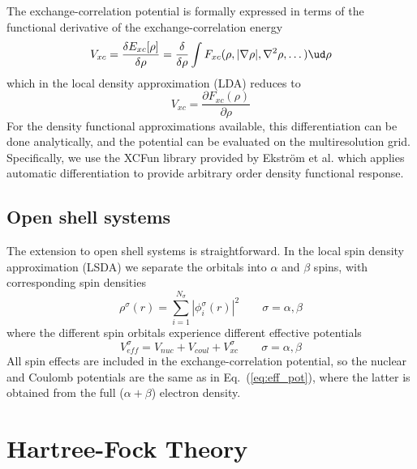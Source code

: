 The exchange-correlation potential is formally expressed in terms of the 
functional derivative of the exchange-correlation energy
\begin{equation}
    V_{xc} 	= \frac{\delta E_{xc}[\rho]}{\delta \rho} 
		= \frac{\delta}{\delta \rho} \int F_{xc}(\rho,|\nabla\rho|,\nabla^2\rho,\dots) \ud \rho
\end{equation}
which in the local density approximation (LDA) reduces to
\begin{equation}
    V_{xc} = \frac{\partial F_{xc}(\rho)}{\partial \rho}
\end{equation}
For the density functional approximations available, this differentiation can 
be done analytically, and the potential can be evaluated on the multiresolution 
grid. Specifically, we use the XCFun library provided by Ekstr\"{o}m et 
al.\cite{XCFun} which applies automatic differentiation to provide arbitrary 
order density functional response.

\subsection{Open shell systems} \label{sec:open_shell_KS}
The extension to open shell systems is straightforward. In the local spin 
density approximation (LSDA) we separate the orbitals into $\alpha$ and 
$\beta$ spins, with corresponding spin densities 
\begin{equation}
    \rho^{\sigma} (r) = \sum_{i=1}^{N_{\sigma}} |\phi_i^{\sigma}(r)|^2 \qquad \sigma = \alpha, \beta
\end{equation} 
where the different spin orbitals experience different effective potentials
\begin{equation}
    V_{eff}^{\sigma} = V_{nuc} + V_{coul} + V_{xc}^{\sigma} \qquad \sigma = \alpha, \beta
\end{equation}
All spin effects are included in the exchange-correlation potential, so the 
nuclear and Coulomb potentials are the same as in Eq.~(\ref{eq:eff_pot}), 
where the latter is obtained from the full ($\alpha + \beta$) electron density.

\section{Hartree-Fock Theory}\label{sec:HFT}

\pagebreak

